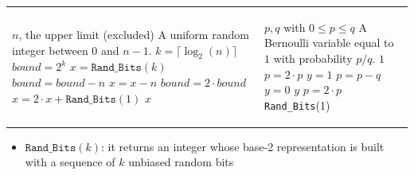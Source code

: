 \begin{algorithm}[H]
\caption{Generating a random integer or a Bernoulli variable} 
\label{algo:RandInt_v_AI}
    \begin{tabular}{l l}
        \begin{minipage}{0.5\textwidth}
	        \begin{algorithmic}[1]
                \renewcommand{\algorithmicrequire}{\textbf{Input:}}
                \renewcommand{\algorithmicensure}{\textbf{Output:}}
                \Require $n$, the upper limit (excluded)
                \Ensure  A uniform random integer between $0$ and $n-1$.
                \Function{\textsc{Uniform}}{$n$}
                    \State $k = \lceil \log_2(n) \rceil$
                    \State $bound = 2^k$
                    \State $x = \texttt{Rand\_Bits}(k)$
                    \While{$bound < n$ \textbf{or} $x \geq n$}
                        \If{$bound \geq n$}
                            \State $bound = bound - n$
                            \State $x = x - n$
                        \EndIf
                        \State $bound = 2 \cdot bound$
                        \State $x = 2 \cdot x + \texttt{Rand\_Bits}(1)$
                    \EndWhile
                    \State \Return $x$
                \EndFunction
	        \end{algorithmic}
        \end{minipage}
        &
        \begin{minipage}{0.5\textwidth}
            \begin{algorithmic}[1]
                \renewcommand{\algorithmicrequire}{\textbf{Input:}}
                \renewcommand{\algorithmicensure}{\textbf{Output:}}
                \Require $p, q$ with $0 \leq p \leq q$
                \Ensure  A Bernoulli variable equal to $1$ with probability $p/q$.
                \Function{\textsc{Bernoulli}}{$p, q$}
                    \If{$p = q$}
                        \State \Return $1$
                    \EndIf
                    \State $p = 2 \cdot p$
                    \While{$p \neq q$}
                        \If{$p > q$}
                            \State $y = 1$
                            \State $p = p - q$
                        \Else
                            \State $y = 0$
                        \EndIf
                        \If{\texttt{Rand\_Bits}(1) == 1}
                            \State \Return $y$
                        \EndIf
                        \State $p = 2 \cdot p$
                    \EndWhile
                    \State \Return \texttt{Rand\_Bits}(1)
                \EndFunction
            \end{algorithmic}
        \end{minipage}
    \end{tabular}
    \begin{itemize}
        \footnotesize 
        \item $\texttt{Rand\_Bits}(k)$: it returns an integer whose base-2 representation is built with a sequence of $k$ unbiased random bits
    \end{itemize}
 \end{algorithm}
